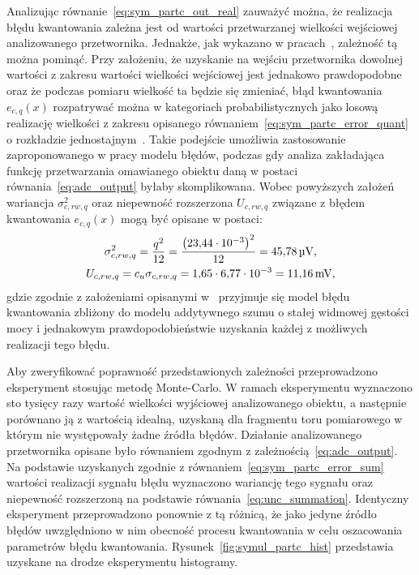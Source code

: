 Analizując równanie~\eqref{eq:sym_partc_out_real} zauważyć można, że realizacja błędu kwantowania zależna jest od wartości przetwarzanej wielkości wejściowej analizowanego przetwornika. Jednakże, jak wykazano w pracach~\cite{sienkowski_kwant, sienkowski_adc}, zależność tą można pominąć. Przy założeniu, że uzyskanie na wejściu przetwornika dowolnej wartości z zakresu wartości wielkości wejściowej jest jednakowo prawdopodobne oraz że podczas pomiaru wielkość ta będzie się zmieniać, błąd kwantowania $e_{c,q}(x)$ rozpatrywać można w kategoriach probabilistycznych jako losową realizację wielkości z zakresu opisanego równaniem~\eqref{eq:sym_partc_error_quant} o rozkładzie jednostajnym~\cite{jakubiec_system}. Takie podejście umożliwia zastosowanie zaproponowanego w pracy modelu błędów, podczas gdy analiza zakładająca funkcję przetwarzania omawianego obiektu daną w postaci równania~\eqref{eq:adc_output} byłaby skomplikowana. Wobec powyższych założeń wariancja $\sigma_{c,rw,q}^{2}$ oraz niepewność rozszerzona $U_{c,rw,q}$ związane z błędem kwantowania $e_{c,q}(x)$ mogą być opisane w postaci:
\begin{gather}
\sigma_{c,rw,q}^{2} = \frac{ q^{2}}{12} = \frac{\left(\num{23.44e-3}\right)^{2} }{12} = \qty{45.78}{\micro V} \label{eq:sym_partc_var_quant}, \\
U_{c,rw,q} = c_{u} \sigma_{c,rw,q} = \num{1.65} \cdot \num{6.77e-3} = \qty{11.16}{mV} \label{eq:sym_partc_uncert_quant},
\end{gather}
gdzie zgodnie z założeniami opisanymi w~\cite{gray_quantization, widrow_quantization} przyjmuje się model błędu kwantowania zbliżony do modelu addytywnego szumu o stałej widmowej gęstości mocy i jednakowym prawdopodobieństwie uzyskania każdej z możliwych realizacji tego błędu.

Aby zweryfikować poprawność przedstawionych zależności przeprowadzono eksperyment stosując metodę Monte-Carlo. W ramach eksperymentu wyznaczono sto tysięcy razy wartość wielkości wyjściowej analizowanego obiektu, a następnie porównano ją z wartością idealną, uzyskaną dla fragmentu toru pomiarowego w którym nie występowały żadne źródła błędów. Działanie analizowanego przetwornika opisane było równaniem zgodnym z zależnością~\eqref{eq:adc_output}. Na podstawie uzyskanych zgodnie z równaniem~\eqref{eq:sym_partc_error_sum} wartości realizacji sygnału błędu wyznaczono wariancję tego sygnału oraz niepewność rozszerzoną na podstawie równania~\eqref{eq:unc_summation}. Identyczny eksperyment przeprowadzono ponownie z tą różnicą, że jako jedyne źródło błędów uwzględniono w nim obecność procesu kwantowania w celu oszacowania parametrów błędu kwantowania. Rysunek~\ref{fig:symul_partc_hist} przedstawia uzyskane na drodze eksperymentu histogramy.

